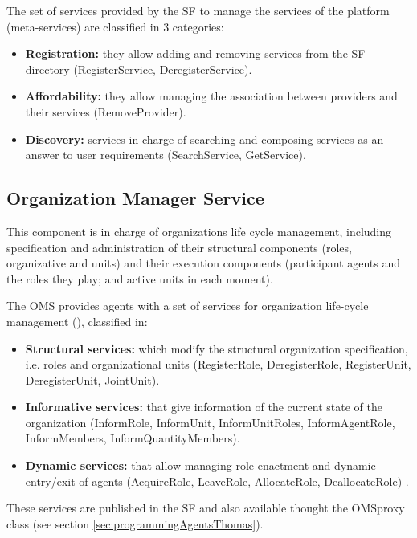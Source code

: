 The set of services provided by the SF to manage the services of the platform (meta-services) are classified in 3 categories:

\begin{itemize}
	\item \textbf{Registration:} they allow adding and removing services from the SF directory (RegisterService, DeregisterService).
	\item \textbf{Affordability:} they allow managing the association between providers and their services (RemoveProvider).
	\item \textbf{Discovery:} services in charge of searching and composing services as an answer to user requirements (SearchService, GetService).
\end{itemize}

\subsection{Organization Manager Service}
This component is in charge of organizations life cycle management, including specification and administration of their structural components (roles, organizative and units) and their execution components (participant agents and the roles they play; and active units in each moment).

The OMS provides agents with a set of services for organization life-cycle management (\cite{DelVal09}), classified in:

\begin{itemize}
	\item \textbf{Structural services:} which modify the structural organization specification, i.e. roles and organizational units (RegisterRole, DeregisterRole, RegisterUnit, DeregisterUnit, JointUnit).
	\item \textbf{Informative services:} that give information of the current state of the organization (InformRole, InformUnit, InformUnitRoles, InformAgentRole, InformMembers, InformQuantityMembers).
	\item \textbf{Dynamic services:} that allow managing role enactment and dynamic entry/exit of agents (AcquireRole, LeaveRole, AllocateRole, DeallocateRole) .
\end{itemize}

These services are  published in the SF and also available thought the OMSproxy class (see section \ref{sec:programmingAgentsThomas}).


